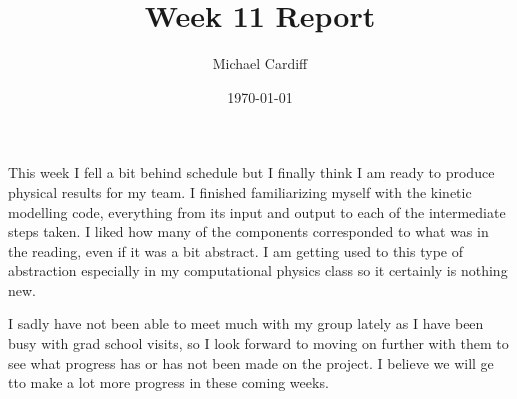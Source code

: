 \documentclass[12pt]{article}
\title{\vspace{-3em}Week 11 Report}
\author{Michael Cardiff}
\date{\today}
\begin{document}
\maketitle
This week I fell a bit behind schedule but I finally think I am ready to produce physical results for my team. I finished familiarizing myself with the kinetic modelling code, everything from its input and output to each of the intermediate steps taken. I liked how many of the components corresponded to what was in the reading, even if it was a bit abstract. I am getting used to this type of abstraction especially in my computational physics class so it certainly is nothing new.

I sadly have not been able to meet much with my group lately as I have been busy with grad school visits, so I look forward to moving on further with them to see what progress has or has not been made on the project. I believe we will ge tto make a lot more progress in these coming weeks. 
\end{document}
